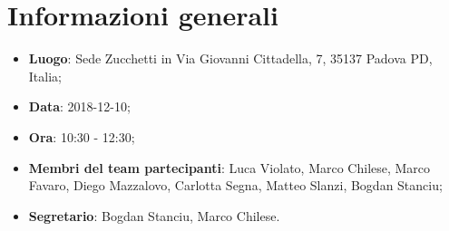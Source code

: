 \section{Informazioni generali}
\begin{itemize}
	\item \textbf{Luogo}: Sede Zucchetti in Via Giovanni Cittadella, 7, 35137 Padova PD, Italia; 
	\item \textbf{Data}: 2018-12-10; 
	\item \textbf{Ora}: 10:30 - 12:30; 
	\item \textbf{Membri del team partecipanti}: Luca Violato, Marco Chilese, Marco Favaro, Diego Mazzalovo, Carlotta Segna, Matteo Slanzi, Bogdan Stanciu; 
	\item \textbf{Segretario}: Bogdan Stanciu, Marco Chilese. 
\end{itemize}






